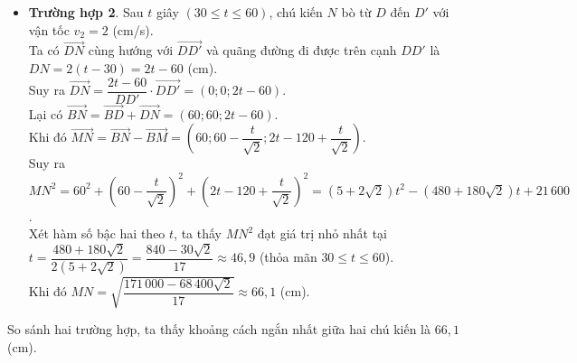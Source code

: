 \begin{ex}
{\begin{itemize}
			\item \textbf{Trường hợp 2}. Sau $t$ giây $\left(30\leq t\leq 60\right)$, chú kiến $N$ bò từ $D$ đến $D'$ với vận tốc $v_2 = 2$ (cm/s).\\
			Ta có $\overrightarrow{DN}$ cùng hướng với $\overrightarrow{DD'}$ và quãng đường đi được trên cạnh $DD'$ là $DN=2(t-30)=2t-60$ (cm).\\
			Suy ra $\overrightarrow{DN}=\dfrac{2t-60}{DD'} \cdot \overrightarrow{DD'}=(0;0;2t-60)$.\\
			Lại có $\overrightarrow{BN}=\overrightarrow{BD}+ \overrightarrow{DN}=
			\left(60;60;2t-60\right)$.\\
			Khi đó $\overrightarrow{MN}=\overrightarrow{BN}-\overrightarrow{BM}=\left(60;60-\dfrac{t}{\sqrt{2}};2t-120+\dfrac{t}{\sqrt{2}}\right)$.\\
			Suy ra $MN^2=60^2+\left(60-\dfrac{t}{\sqrt{2}}\right)^2+\left(2t-120+\dfrac{t}{\sqrt{2}}\right)^2=\left(5+2\sqrt{2}\right)t^2-\left(480+180\sqrt{2}\right)t+21\,600$.\\
			Xét hàm số bậc hai theo $t$, ta thấy $MN^2$ đạt giá trị nhỏ nhất tại $t=\dfrac{480+180\sqrt{2}}{2(5+2\sqrt{2})}=\dfrac{840-30\sqrt{2}}{17} \approx 46{,}9$ (thỏa mãn $30\leq t \leq 60$).\\
			Khi đó $MN = \sqrt{\dfrac{171\,000-68\,400\sqrt{2}}{17}} \approx 66{,}1$ (cm).
		\end{itemize}
		So sánh hai trường hợp, ta thấy khoảng cách ngắn nhất giữa hai chú kiến là $66{,}1$ (cm).
	}
\end{ex}

